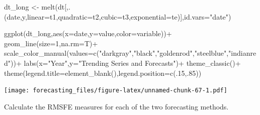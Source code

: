 \documentclass[
  12pt,
  oneside]{book}
\newenvironment{Shaded}{\begin{snugshade}}{\end{snugshade}}
\newcommand{\AttributeTok}[1]{\textcolor[rgb]{0.77,0.63,0.00}{#1}}
\newcommand{\DecValTok}[1]{\textcolor[rgb]{0.00,0.00,0.81}{#1}}
\newcommand{\FunctionTok}[1]{\textcolor[rgb]{0.00,0.00,0.00}{#1}}
\newcommand{\NormalTok}[1]{#1}
\newcommand{\OtherTok}[1]{\textcolor[rgb]{0.56,0.35,0.01}{#1}}
\newcommand{\SpecialCharTok}[1]{\textcolor[rgb]{0.00,0.00,0.00}{#1}}
\newcommand{\StringTok}[1]{\textcolor[rgb]{0.31,0.60,0.02}{#1}}
\begin{document}
\begin{Shaded}
\begin{Highlighting}[]
\NormalTok{dt\_long }\OtherTok{\textless{}{-}} \FunctionTok{melt}\NormalTok{(dt[,.(date,y,}\AttributeTok{linear=}\NormalTok{t1,}\AttributeTok{quadratic=}\NormalTok{t2,}\AttributeTok{cubic=}\NormalTok{t3,}\AttributeTok{exponential=}\NormalTok{te)],}\AttributeTok{id.vars=}\StringTok{"date"}\NormalTok{)}

\FunctionTok{ggplot}\NormalTok{(dt\_long,}\FunctionTok{aes}\NormalTok{(}\AttributeTok{x=}\NormalTok{date,}\AttributeTok{y=}\NormalTok{value,}\AttributeTok{color=}\NormalTok{variable))}\SpecialCharTok{+}
  \FunctionTok{geom\_line}\NormalTok{(}\AttributeTok{size=}\DecValTok{1}\NormalTok{,}\AttributeTok{na.rm=}\NormalTok{T)}\SpecialCharTok{+}
  \FunctionTok{scale\_color\_manual}\NormalTok{(}\AttributeTok{values=}\FunctionTok{c}\NormalTok{(}\StringTok{"darkgray"}\NormalTok{,}\StringTok{"black"}\NormalTok{,}\StringTok{"goldenrod"}\NormalTok{,}\StringTok{"steelblue"}\NormalTok{,}\StringTok{"indianred"}\NormalTok{))}\SpecialCharTok{+}
  \FunctionTok{labs}\NormalTok{(}\AttributeTok{x=}\StringTok{"Year"}\NormalTok{,}\AttributeTok{y=}\StringTok{"Trending Series and Forecasts"}\NormalTok{)}\SpecialCharTok{+}
  \FunctionTok{theme\_classic}\NormalTok{()}\SpecialCharTok{+}
  \FunctionTok{theme}\NormalTok{(}\AttributeTok{legend.title=}\FunctionTok{element\_blank}\NormalTok{(),}\AttributeTok{legend.position=}\FunctionTok{c}\NormalTok{(.}\DecValTok{15}\NormalTok{,.}\DecValTok{85}\NormalTok{))}
\end{Highlighting}
\end{Shaded}

\texttt{[image: forecasting\_files/figure-latex/unnamed-chunk-67-1.pdf]}

Calculate the RMSFE measures for each of the two forecasting methods.
\end{document}
